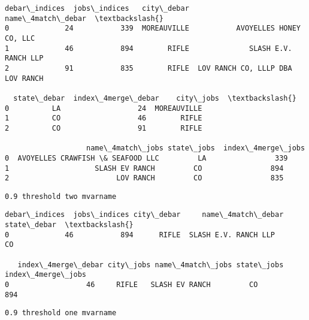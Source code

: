 \documentclass[11pt]{article}
\makeatletter
\newcommand{\boxspacing}{\kern\kvtcb@left@rule\kern\kvtcb@boxsep}
\newcommand{\prompt}[4]{
        {\ttfamily\llap{{\color{#2}[#3]:\hspace{3pt}#4}}\vspace{-\baselineskip}}
    }
\makeatother
\begin{document}
            \begin{tcolorbox}[breakable, size=fbox, boxrule=.5pt, pad at break*=1mm, opacityfill=0]
\prompt{Out}{outcolor}{182}{\boxspacing}
\begin{Verbatim}[commandchars=\\\{\}]
   debar\_indices  jobs\_indices   city\_debar                 name\_4match\_debar  \textbackslash{}
0             24           339  MOREAUVILLE           AVOYELLES HONEY CO, LLC
1             46           894        RIFLE              SLASH E.V. RANCH LLP
2             91           835        RIFLE  LOV RANCH CO, LLLP DBA LOV RANCH

  state\_debar  index\_4merge\_debar    city\_jobs  \textbackslash{}
0          LA                  24  MOREAUVILLE
1          CO                  46        RIFLE
2          CO                  91        RIFLE

                   name\_4match\_jobs state\_jobs  index\_4merge\_jobs
0  AVOYELLES CRAWFISH \& SEAFOOD LLC         LA                339
1                    SLASH EV RANCH         CO                894
2                         LOV RANCH         CO                835
\end{Verbatim}
\end{tcolorbox}
        
    \begin{Verbatim}[commandchars=\\\{\}]
0.9 threshold two mvarname
    \end{Verbatim}

            \begin{tcolorbox}[breakable, size=fbox, boxrule=.5pt, pad at break*=1mm, opacityfill=0]
\prompt{Out}{outcolor}{182}{\boxspacing}
\begin{Verbatim}[commandchars=\\\{\}]
   debar\_indices  jobs\_indices city\_debar     name\_4match\_debar state\_debar  \textbackslash{}
0             46           894      RIFLE  SLASH E.V. RANCH LLP          CO

   index\_4merge\_debar city\_jobs name\_4match\_jobs state\_jobs  index\_4merge\_jobs
0                  46     RIFLE   SLASH EV RANCH         CO                894
\end{Verbatim}
\end{tcolorbox}
        
    \begin{Verbatim}[commandchars=\\\{\}]
0.9 threshold one mvarname
    \end{Verbatim}
\end{document}
